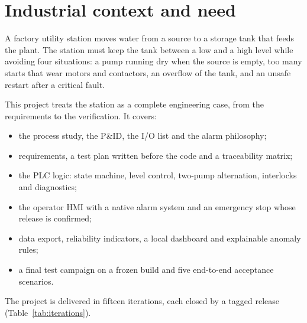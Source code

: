 \documentclass[11pt,a4paper]{report}
\renewcommand{\headrulewidth}{0pt}%
\begin{document}
	\clearpage
	\pagestyle{fancy}
	\fancyhf{}
	\fancyhead[L]{\small\leftmark}
	\fancyhead[R]{\small\thepage}
	\renewcommand{\headrulewidth}{0.4pt}
	\renewcommand{\chaptermark}[1]{\markboth{Chapter \thechapter.\ #1}{}}
	
	\chapter{Industrial context and need}\label{ch:context}
	
	A factory utility station moves water from a source to a storage tank that feeds the plant. The station must keep the tank between a low and a high level while avoiding four situations: a pump running dry when the source is empty, too many starts that wear motors and contactors, an overflow of the tank, and an unsafe restart after a critical fault.
	
	This project treats the station as a complete engineering case, from the requirements to the verification. It covers:
	\begin{itemize}
		\item the process study, the P\&ID, the I/O list and the alarm philosophy;
		\item requirements, a test plan written before the code and a traceability matrix;
		\item the PLC logic: state machine, level control, two-pump alternation, interlocks and diagnostics;
		\item the operator HMI with a native alarm system and an emergency stop whose release is confirmed;
		\item data export, reliability indicators, a local dashboard and explainable anomaly rules;
		\item a final test campaign on a frozen build and five end-to-end acceptance scenarios.
	\end{itemize}
	
	The project is delivered in fifteen iterations, each closed by a tagged release (Table~\ref{tab:iterations}).
	
\end{document}
